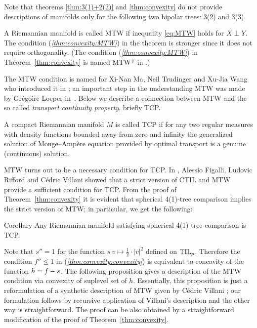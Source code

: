 Note that theorems \ref{thm:3(1)+2(2)} and \ref{thm:convexity} do not provide descriptions of manifolds only for the following two bipolar trees: 3(2) and 3(3).

A Riemannian manifold is called MTW if inequality \ref{eq:MTW} holds for $X\perp Y$.
The condition (\textit{\ref{thm:convexity:MTW}}) in the theorem is stronger since it does not require orthogonality.
(The condition (\textit{\ref{thm:convexity:MTW}}) in Theorem~\ref{thm:convexity} is named MTW$^{\not\perp}$ in \cite{FRV-Nec+Suf}.)

The MTW condition is named for Xi-Nan Ma, Neil Trudinger and Xu-Jia Wang who introduced it in \cite{MTW};
an important step in the understanding MTW was made by Grégoire Loeper in~\cite{loeper}.
Below we describe a connection between MTW and the so called \emph{transport continuity property}, briefly TCP.

A compact Riemannian manifold $M$ is called TCP 
if for any two regular measures with density functions bounded away from zero and infinity the generalized solution of Monge--Amp\`{e}re equation provided by optimal transport 
is a genuine (continuous) solution.

MTW turns out to be a necessary condition for TCP.
In \cite{FRV-Nec+Suf}, Alessio Figalli, Ludovic Rifford and C\'edric Villani showed that
a strict version of CTIL and MTW provide a sufficient condition for TCP.
From the proof of Theorem~\ref{thm:convexity} it is evident that spherical 4(1)-tree comparison implies the strict version of MTW; in particular, we get the following:

\begin{thm}{Corollary}
Any Riemannian manifold satisfying spherical 4(1)-tree comparison is TCP.
\end{thm}

Note that $s''=1$ for the function $s\:v\mapsto\tfrac12\cdot|v|^2$ defined on $\mathrm{\rm TIL}_p$.
Therefore the condition $f''\le 1$ in (\textit{\ref{thm:convexity:convexity}}) is equivalent to 
concavity of the function $h\zz=f-s$.
The following proposition gives a description of the MTW condition via convexity of suplevel set of $h$.
Essentially, this proposition is just a reformulation of a synthetic description of MTW given by C\'edric Villani \cite[Proposition 2.6]{MTW+CTIL};
our formulation follows by recursive application of Villani's description and the other way is straightforward. 
The proof can be also obtained by a straightforward modification of the proof of Theorem~\ref{thm:convexity}.

